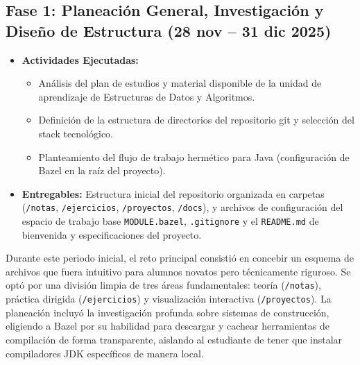\documentclass[12 pt]{article}
\begin{document}
\subsection*{Fase 1: Planeación General, Investigación y Diseño de Estructura (28 nov – 31 dic 2025)}
\begin{itemize}
    \item \textbf{Actividades Ejecutadas:}
    \begin{itemize}
        \item Análisis del plan de estudios y material disponible de la unidad de aprendizaje de Estructuras de Datos y Algoritmos.
        \item Definición de la estructura de directorios del repositorio git y selección del stack tecnológico.
        \item Planteamiento del flujo de trabajo hermético para Java (configuración de Bazel en la raíz del proyecto).
    \end{itemize}
    \item \textbf{Entregables:} Estructura inicial del repositorio organizada en carpetas (\texttt{/notas}, \texttt{/ejercicios}, \texttt{/proyectos}, \texttt{/docs}), y archivos de configuración del espacio de trabajo base \texttt{MODULE.bazel}, \texttt{.gitignore} y el \texttt{README.md} de bienvenida y especificaciones del proyecto.
\end{itemize}

Durante este periodo inicial, el reto principal consistió en concebir un esquema de archivos que fuera intuitivo para alumnos novatos pero técnicamente riguroso. Se optó por una división limpia de tres áreas fundamentales: teoría (\texttt{/notas}), práctica dirigida (\texttt{/ejercicios}) y visualización interactiva (\texttt{/proyectos}). La planeación incluyó la investigación profunda sobre sistemas de construcción, eligiendo a Bazel por su habilidad para descargar y cachear herramientas de compilación de forma transparente, aislando al estudiante de tener que instalar compiladores JDK específicos de manera local.
\end{document}

